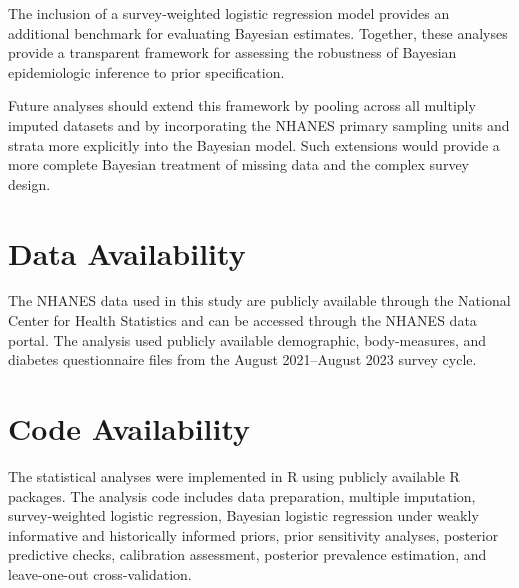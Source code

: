 \documentclass[12pt]{article}
\begin{document}
The inclusion of a survey-weighted logistic regression model provides an additional benchmark for evaluating Bayesian estimates. Together, these analyses provide a transparent framework for assessing the robustness of Bayesian epidemiologic inference to prior specification.

Future analyses should extend this framework by pooling across all multiply imputed datasets and by incorporating the NHANES primary sampling units and strata more explicitly into the Bayesian model. Such extensions would provide a more complete Bayesian treatment of missing data and the complex survey design.


\section*{Data Availability}

The NHANES data used in this study are publicly available through the National Center for Health Statistics and can be accessed through the NHANES data portal. The analysis used publicly available demographic, body-measures, and diabetes questionnaire files from the August 2021--August 2023 survey cycle.


\section*{Code Availability}

The statistical analyses were implemented in R using publicly available R packages. The analysis code includes data preparation, multiple imputation, survey-weighted logistic regression, Bayesian logistic regression under weakly informative and historically informed priors, prior sensitivity analyses, posterior predictive checks, calibration assessment, posterior prevalence estimation, and leave-one-out cross-validation.




% 
\end{document}
